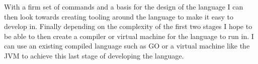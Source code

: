 \documentclass[12pt]{article}
\begin{document}
With a firm set of commands and a basis for the design of the language I can then look towards creating tooling around the language to make it easy to develop in. Finally depending on
the complexity of the first two stages I hope to be able to then create a compiler or virtual machine for the language to run in. I can use an existing compiled language such as GO or a virtual machine like the JVM
to achieve this last stage of developing the language.


\clearpage

\printbibliography
\end{document}

